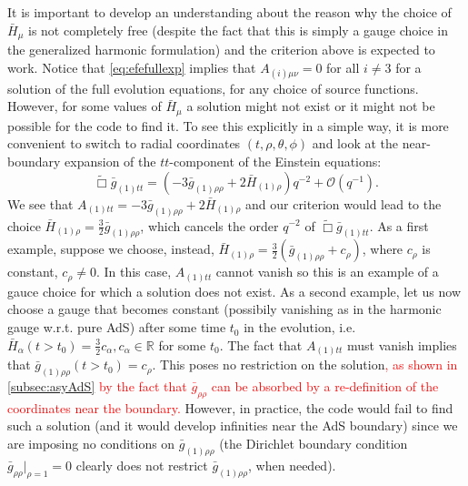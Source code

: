 \documentclass[a4paper,11pt]{article}
\numberwithin{equation}{section}
\begin{document}
It is important to develop an understanding about the reason why the choice of $\bar{H}_\mu$ is not completely free (despite the fact that this is simply a gauge choice in the generalized harmonic formulation) and the criterion above is expected to work. 
Notice that \eqref{eq:efefullexp} implies that $A_{(i)\mu\nu}=0$ for all $i\neq3$ for a solution of the full evolution equations, for any choice of source functions.
%
However, for some values of $\bar{H}_\mu$ a solution might not exist or it might not be possible for the code to find it. To see this explicitly in a simple way, it is more convenient to switch to radial coordinates $(t,\rho,\theta,\phi)$ and look at the near-boundary expansion of the $tt$-component of the Einstein equations:
\begin{equation}\label{eqn:efettsph}
\tilde{\Box}\bar{g}_{(1)tt}=(-3 \bar{g}_{(1)\rho\rho}+2\bar{H}_{(1)\rho})q^{-2}+\mathcal{O}(q^{-1}).
\end{equation}
We see that $A_{(1)tt}=-3 \bar{g}_{(1)\rho\rho}+2\bar{H}_{(1)\rho}$ and our criterion would lead to the choice $\bar{H}_{(1)\rho}=\frac{3}{2} \bar{g}_{(1)\rho\rho}$, which cancels the order $q^{-2}$ of $\tilde{\Box}\bar{g}_{(1)tt}$.
As a first example, suppose we choose, instead, $\bar{H}_{(1)\rho}=\frac{3}{2}( \bar{g}_{(1)\rho\rho}+c_\rho)$, where $c_\rho$ is constant, $c_\rho\ne0$. In this case, $A_{(1)tt}$ cannot vanish so this is an example of a gauce choice for which a solution does not exist.
As a second example, let us now choose a gauge that becomes constant (possibily vanishing as in the harmonic gauge w.r.t. pure AdS) after some time $t_0$ in the evolution, i.e. $\bar{H}_{\alpha}(t>t_0)=\frac{3}{2}c_{\alpha},c_{\alpha}\in \mathbb{R}$ for some $t_0$. The fact that $A_{(1)tt}$ must vanish implies that $\bar{g}_{(1)\rho\rho}(t>t_0)=c_\rho$. This poses no restriction on the solution\textcolor{red}{, as shown in \ref{subsec:asyAdS} by the fact that $\bar{g}_{\rho\rho}$ can be absorbed by a re-definition of the coordinates near the boundary.} However, in practice, the code would fail to find such a solution (and it would develop infinities near the AdS boundary) since we are imposing no conditions on  $\bar{g}_{(1)\rho\rho}$ (the Dirichlet boundary condition $\bar{g}_{\rho\rho}|_{\rho=1}=0$ clearly does not restrict $\bar{g}_{(1)\rho\rho}$, when needed).
\end{document}

